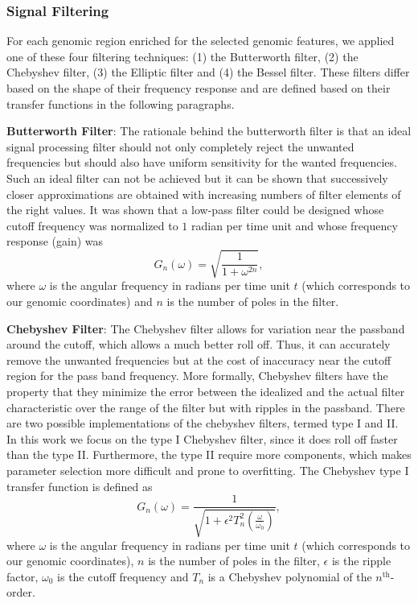 \subsubsection{Signal Filtering}
\label{sec:signal.filtering}

For each genomic region enriched for the selected genomic features, we applied one of these four filtering techniques: (1) the Butterworth filter, (2) the Chebyshev filter, (3) the Elliptic filter and (4) the Bessel filter. These filters differ based on the shape of their frequency response and are defined based on their transfer functions in the following paragraphs.

\textbf{Butterworth Filter}: The rationale behind the butterworth filter is that an ideal signal processing filter should not only completely reject the unwanted frequencies but should also have uniform sensitivity for the wanted frequencies. Such an ideal filter can not be achieved but it can be shown that successively closer approximations are obtained with increasing numbers of filter elements of the right values. It was shown that a low-pass filter could be designed whose cutoff frequency was normalized to $1$ radian per time unit and whose frequency response (gain) was
\begin{equation}
  \label{eq:butterworth1}
  G_n(\omega) = \sqrt{\frac{1}{{1+\omega^{2n}}}},
\end{equation}
where $ \omega $ is the angular frequency in radians per time unit $ t $ (which corresponds to our genomic coordinates) and $n$ is the number of poles in the filter.

\textbf{Chebyshev Filter}: The Chebyshev filter allows for variation near the passband around the cutoff, which allows a much better roll off. Thus, it can accurately remove the unwanted frequencies but at the cost of inaccuracy near the cutoff region for the pass band frequency. More formally, Chebyshev filters have the property that they minimize the error between the idealized and the actual filter characteristic over the range of the filter but with ripples in the passband. There are two possible implementations of the chebyshev filters, termed type I and II. In this work we focus on the type I Chebyshev filter, since it does roll off faster than the type II. Furthermore, the type II require more components, which makes parameter selection more difficult and prone to overfitting. The Chebyshev type I transfer function is defined as
\begin{equation}
  \label{eq:chebyshev1}
  G_n(\omega) = \frac{1}{\sqrt{1+{\epsilon^2 {T}_{n}^{2} (\frac{\omega}{\omega_0})}}},
\end{equation}
where $ \omega $ is the angular frequency in radians per time unit $ t $ (which corresponds to our genomic coordinates), $n$ is the number of poles in the filter, $ \epsilon $ is the ripple factor, $ \omega_0 $ is the cutoff frequency and $ T_n $ is a Chebyshev polynomial of the $n^{\text{th}}$-order.

